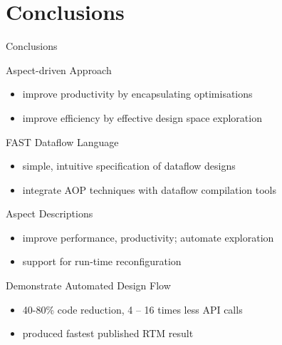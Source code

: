 \section{Conclusions}

\begin{frame}{Conclusions}

  \begin{beamerboxesrounded}{Aspect-driven Approach}
    \begin{itemize}
    \item improve productivity by encapsulating optimisations
    \item improve efficiency by effective design space exploration
    \end{itemize}
  \end{beamerboxesrounded}

  \begin{beamerboxesrounded}{FAST Dataflow Language}
    \begin{itemize}
    \item simple, intuitive specification of dataflow designs
    \item integrate AOP techniques with dataflow compilation tools
    \end{itemize}
  \end{beamerboxesrounded}

  \begin{beamerboxesrounded}{Aspect Descriptions}
    \begin{itemize}
      \item improve performance, productivity; automate exploration
      \item support for run-time reconfiguration
    \end{itemize}
  \end{beamerboxesrounded}

  \begin{beamerboxesrounded}{Demonstrate Automated Design Flow}
    \begin{itemize}
    \item 40-80\% code reduction, 4 -- 16 times less API calls
    \item produced fastest published RTM result
    \end{itemize}
  \end{beamerboxesrounded}

\end{frame}

